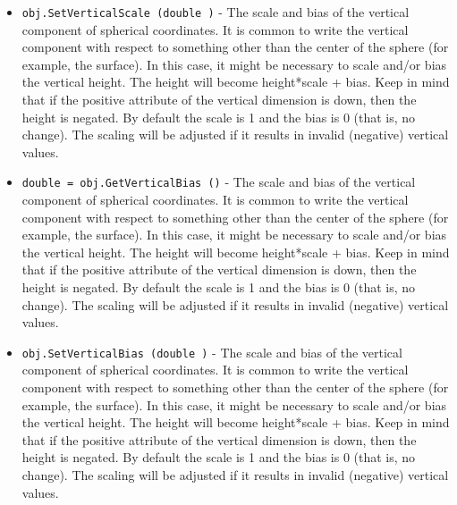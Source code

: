 \begin{itemize}
\item  \verb|obj.SetVerticalScale (double )| -  The scale and bias of the vertical component of spherical coordinates.  It
 is common to write the vertical component with respect to something other
 than the center of the sphere (for example, the surface).  In this case, it
 might be necessary to scale and/or bias the vertical height.  The height
 will become height*scale + bias.  Keep in mind that if the positive
 attribute of the vertical dimension is down, then the height is negated.
 By default the scale is 1 and the bias is 0 (that is, no change).  The
 scaling will be adjusted if it results in invalid (negative) vertical
 values.

\item  \verb|double = obj.GetVerticalBias ()| -  The scale and bias of the vertical component of spherical coordinates.  It
 is common to write the vertical component with respect to something other
 than the center of the sphere (for example, the surface).  In this case, it
 might be necessary to scale and/or bias the vertical height.  The height
 will become height*scale + bias.  Keep in mind that if the positive
 attribute of the vertical dimension is down, then the height is negated.
 By default the scale is 1 and the bias is 0 (that is, no change).  The
 scaling will be adjusted if it results in invalid (negative) vertical
 values.

\item  \verb|obj.SetVerticalBias (double )| -  The scale and bias of the vertical component of spherical coordinates.  It
 is common to write the vertical component with respect to something other
 than the center of the sphere (for example, the surface).  In this case, it
 might be necessary to scale and/or bias the vertical height.  The height
 will become height*scale + bias.  Keep in mind that if the positive
 attribute of the vertical dimension is down, then the height is negated.
 By default the scale is 1 and the bias is 0 (that is, no change).  The
 scaling will be adjusted if it results in invalid (negative) vertical
 values.

\end{itemize}

